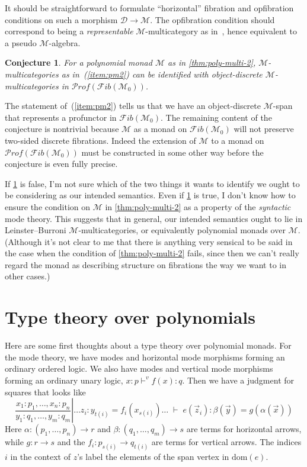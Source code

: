 \documentclass{article}
\newtheorem{conj}[thm]{Conjecture}
\theoremstyle{definition}
\theoremstyle{remark}
\def\M{\mathcal{M}}
\def\Fib{\mathcal{F}\mathit{ib}}
\def\Prof{\mathcal{P}\mathit{rof}}
\def\D{\mathcal{D}}
\def\dom{\mathrm{dom}}
\begin{document}
It should be straightforward to formulate ``horizontal'' fibration and opfibration conditions on such a morphism $\D\to\M$.
The opfibration condition should correspond to being a \emph{representable} $\M$-multicategory as in~\cite{hermida:coh-univ,hermida:multicats,cs:multicats}, hence equivalent to a pseudo $\M$-algebra.

\begin{conj}\label{thm:poly-multi-3}
  For a polynomial monad $\M$ as in \cref{thm:poly-multi-2}, $\M$-multicategories as in~(\ref{item:pm2}) can be identified with object-discrete $\M$-multicategories in $\Prof(\Fib(\M_0))$.
\end{conj}

The statement of~(\ref{item:pm2}) tells us that we have an object-discrete $\M$-span that represents a profunctor in $\Fib(\M_0)$.
The remaining content of the conjecture is nontrivial because $\M$ as a monad on $\Fib(\M_0)$ will not preserve two-sided discrete fibrations.
Indeed the extension of $\M$ to a monad on $\Prof(\Fib(\M_0))$ must be constructed in some other way before the conjecture is even fully precise.

If \cref{thm:poly-multi-3} is false, I'm not sure which of the two things it wants to identify we ought to be considering as our intended semantics.
Even if \cref{thm:poly-multi-3} is true, I don't know how to ensure the condition on $\M$ in \cref{thm:poly-multi-2} as a property of the \emph{syntactic} mode theory.
This suggests that in general, our intended semantics ought to lie in Leinster--Burroni $\M$-multicategories, or equivalently polynomial monads over $\M$.
(Although it's not clear to me that there is anything very sensical to be said in the case when the condition of \cref{thm:poly-multi-2} fails, since then we can't really regard the monad as describing structure on fibrations the way we want to in other cases.)


\section{Type theory over polynomials}
\label{sec:tt-poly}

Here are some first thoughts about a type theory over polynomial monads.
For the mode theory, we have modes and horizontal mode morphisms forming an ordinary ordered logic.
We also have modes and vertical mode morphisms forming an ordinary unary logic, $x:p \vdash^v f(x):q$.
Then we have a judgment for squares that looks like
\[
\left.{\textstyle\frac{x_1:p_1, \dots, x_n:p_n} {y_1:q_1,\dots,y_m:q_m}} \right| \dots z_i:y_{t(i)} = f_i(x_{s(i)}) \dots  \;\vdash\; e(\vec z_i) : {\beta(\vec y)} = g({\alpha(\vec x)})
\]
Here $\alpha : (p_1,\dots,p_n) \to r$ and $\beta: (q_1,\dots,q_m)\to s$ are terms for horizontal arrows, while $g:r\to s$ and the $f_i:p_{s(i)}\to q_{t(i)}$ are terms for vertical arrows.
The indices $i$ in the context of $z$'s label the elements of the span vertex in $\dom(e)$.
\end{document}
